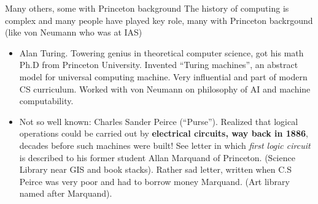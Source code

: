 \documentclass[aspectratio=169]{beamer}
\newcommand{\mypause}{}
\begin{document}
\begin{frame}{Many others, some with Princeton background}
  The history of computing is complex and many people have played key
  role, many with Princeton backrgound (like von Neumann who was at
  IAS)
  \begin{itemize}
  \item Alan Turing. Towering genius in theoretical computer science,
    got his math Ph.D from Princeton University. Invented ``Turing
    machines'', an abstract model for universal computing
    machine. Very influential and part of modern CS curriculum. Worked
    with von Neumann on philosophy of AI and machine computability.%
    \mypause%
  \item Not so well known: Charles Sander Peirce (``Purse''). Realized
    that logical operations could be carried out by {\bf electrical
      circuits, way back in 1886}, decades before such machines were
    built! See letter in which \emph{first logic circuit} is described
    to his former student Allan Marquand of Princeton. (Science
    Library near GIS and book stacks). Rather sad letter, written when
    C.S Peirce was very poor and had to borrow money Marquand. (Art
    library named after Marquand).
  \end{itemize}
\end{frame}
\end{document}
